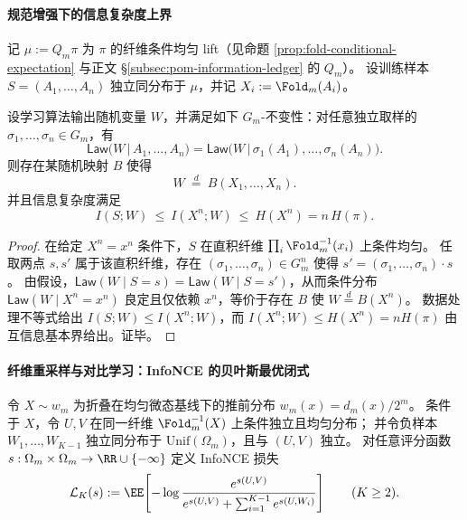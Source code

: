 \paragraph{规范增强下的信息复杂度上界}
记 \(\mu:=Q_m\pi\) 为 \(\pi\) 的纤维条件均匀 lift（见命题 \ref{prop:fold-conditional-expectation} 与正文 \S\ref{subsec:pom-information-ledger} 的 \(Q_m\)）。
设训练样本 \(S=(A_1,\dots,A_n)\) 独立同分布于 \(\mu\)，并记 \(X_i:=\Fold_m(A_i)\)。

\begin{proposition}[纤维置换不变性 \texorpdfstring{$\Rightarrow$}{=>} 仅依赖可见变量]\label{prop:op-algebra-fold-gauge-mi-bound}
设学习算法输出随机变量 \(W\)，并满足如下 \(G_m\)-不变性：对任意独立取样的 \(\sigma_1,\dots,\sigma_n\in G_m\)，有
\[
\mathsf{Law}\bigl(W\,\big|\,A_1,\dots,A_n\bigr)
=\mathsf{Law}\bigl(W\,\big|\,\sigma_1(A_1),\dots,\sigma_n(A_n)\bigr).
\]
则存在某随机映射 \(B\) 使得
\[
W\ \stackrel{d}{=}\ B(X_1,\dots,X_n).
\]
并且信息复杂度满足
\[
I(S;W)\ \le\ I(X^n;W)\ \le\ H(X^n)=n\,H(\pi).
\]
\end{proposition}
\begin{proof}
在给定 \(X^n=x^n\) 条件下，\(S\) 在直积纤维 \(\prod_i\Fold_m^{-1}(x_i)\) 上条件均匀。
任取两点 \(s,s'\) 属于该直积纤维，存在 \((\sigma_1,\dots,\sigma_n)\in G_m^n\) 使得 \(s'=(\sigma_1,\dots,\sigma_n)\cdot s\)。
由假设，\(\mathsf{Law}(W\mid S=s)=\mathsf{Law}(W\mid S=s')\)，从而条件分布 \(\mathsf{Law}(W\mid X^n=x^n)\) 良定且仅依赖 \(x^n\)，等价于存在 \(B\) 使 \(W\stackrel d=B(X^n)\)。
数据处理不等式给出 \(I(S;W)\le I(X^n;W)\)，而 \(I(X^n;W)\le H(X^n)=nH(\pi)\) 由互信息基本界给出。证毕。
\end{proof}

\paragraph{纤维重采样与对比学习：InfoNCE 的贝叶斯最优闭式}\label{par:op-algebra-fold-infonce-fiber}
令 \(X\sim w_m\) 为折叠在均匀微态基线下的推前分布
\(
w_m(x)=d_m(x)/2^m
\)。
条件于 \(X\)，令 \(U,V\) 在同一纤维 \(\Fold_m^{-1}(X)\) 上条件独立且均匀分布；
并令负样本 \(W_1,\dots,W_{K-1}\) 独立同分布于 \(\mathrm{Unif}(\Omega_m)\)，且与 \((U,V)\) 独立。
对任意评分函数 \(s:\Omega_m\times\Omega_m\to\RR\cup\{-\infty\}\) 定义 InfoNCE 损失
\[
\mathcal L_K(s):=\EE\!\left[
-\log\frac{e^{s(U,V)}}{e^{s(U,V)}+\sum_{i=1}^{K-1}e^{s(U,W_i)}}
\right]\qquad(K\ge 2).
\]

